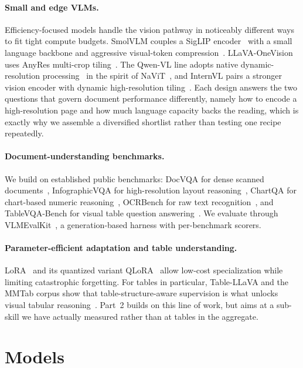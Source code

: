 \documentclass{article}
\begin{document}
\paragraph{Small and edge VLMs.}
Efficiency-focused models handle the vision pathway in noticeably different ways
to fit tight compute budgets. SmolVLM couples a SigLIP
encoder~\citep{zhai2023siglip} with a small language backbone and aggressive
visual-token compression~\citep{marafioti2025smolvlm}. LLaVA-OneVision uses
AnyRes multi-crop tiling~\citep{li2024llavaonevision}. The Qwen-VL line adopts
native dynamic-resolution processing~\citep{wang2024qwen2vl} in the spirit of
NaViT~\citep{dehghani2023navit}, and InternVL pairs a stronger vision encoder
with dynamic high-resolution tiling~\citep{chen2024internvl}. Each design answers
the two questions that govern document performance differently, namely how to
encode a high-resolution page and how much language capacity backs the reading,
which is exactly why we assemble a diversified shortlist rather than testing one
recipe repeatedly.

\paragraph{Document-understanding benchmarks.}
We build on established public benchmarks: DocVQA for dense scanned
documents~\citep{mathew2021docvqa}, InfographicVQA for high-resolution
layout reasoning~\citep{mathew2022infographicvqa}, ChartQA for chart-based
numeric reasoning~\citep{masry2022chartqa}, OCRBench for raw text
recognition~\citep{liu2024ocrbench}, and TableVQA-Bench for visual table
question answering~\citep{kim2024tablevqa}. We evaluate through
VLMEvalKit~\citep{duan2024vlmevalkit}, a generation-based harness with
per-benchmark scorers.

\paragraph{Parameter-efficient adaptation and table understanding.}
LoRA~\citep{hu2022lora} and its quantized variant
QLoRA~\citep{dettmers2023qlora} allow low-cost specialization while limiting
catastrophic forgetting. For tables in particular, Table-LLaVA and the MMTab
corpus show that table-structure-aware supervision is what unlocks visual
tabular reasoning~\citep{zheng2024mmtab}. Part~2 builds on this line of work, but
aims at a sub-skill we have actually measured rather than at tables in the
aggregate.

\section{Models}
\label{sec:models}
\end{document}
